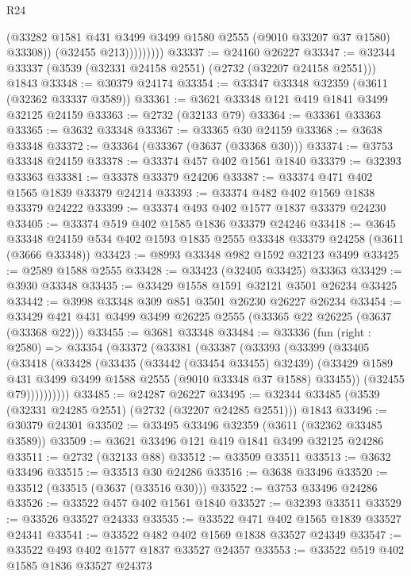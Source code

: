 \begin{lexlean}{R24}
\begin{coremodule}
                      (@33282 @1581 @431 @3499 @3499 @1580 @2555 (@9010 @33207 @37 @1580) @33308))
                    (@32455 @213)))))))))
@33337 := @24160 @26227
@33347 := @32344 @33337 (@3539 (@32331 @24158 @2551) (@2732 (@32207 @24158 @2551))) @1843
@33348 := @30379 @24174
@33354 := @33347 @33348 @32359 (@3611 (@32362 @33337 @3589))
@33361 := @3621 @33348 @121 @419 @1841 @3499 @32125 @24159
@33363 := @2732 (@32133 @79)
@33364 := @33361 @33363
@33365 := @3632 @33348
@33367 := @33365 @30 @24159
@33368 := @3638 @33348
@33372 := @33364 (@33367 (@3637 (@33368 @30)))
@33374 := @3753 @33348 @24159
@33378 := @33374 @457 @402 @1561 @1840
@33379 := @32393 @33363
@33381 := @33378 @33379 @24206
@33387 := @33374 @471 @402 @1565 @1839 @33379 @24214
@33393 := @33374 @482 @402 @1569 @1838 @33379 @24222
@33399 := @33374 @493 @402 @1577 @1837 @33379 @24230
@33405 := @33374 @519 @402 @1585 @1836 @33379 @24246
@33418 := @3645
    @33348
    @24159
    @534
    @402
    @1593
    @1835
    @2555
    @33348
    @33379
    @24258
    (@3611 (@3666 @33348))
@33423 := @8993 @33348 @982 @1592 @32123 @3499
@33425 := @2589 @1588 @2555
@33428 := @33423 (@32405 @33425) @33363
@33429 := @3930 @33348
@33435 := @33429 @1558 @1591 @32121 @3501 @26234 @33425
@33442 := @3998 @33348 @309 @851 @3501 @26230 @26227 @26234
@33454 := @33429 @421 @431 @3499 @3499 @26225 @2555 (@33365 @22 @26225 (@3637 (@33368 @22)))
@33455 := @3681 @33348
@33484 := @33336
    (fun (right : @2580) =>
    @33354
      (@33372
        (@33381
          (@33387
            (@33393
              (@33399
                (@33405
                  (@33418
                    (@33428
                      (@33435
                        (@33442 (@33454 @33455) @32439)
                        (@33429 @1589 @431 @3499 @3499 @1588 @2555 (@9010 @33348 @37 @1588) @33455))
                      (@32455 @79))))))))))
@33485 := @24287 @26227
@33495 := @32344 @33485 (@3539 (@32331 @24285 @2551) (@2732 (@32207 @24285 @2551))) @1843
@33496 := @30379 @24301
@33502 := @33495 @33496 @32359 (@3611 (@32362 @33485 @3589))
@33509 := @3621 @33496 @121 @419 @1841 @3499 @32125 @24286
@33511 := @2732 (@32133 @88)
@33512 := @33509 @33511
@33513 := @3632 @33496
@33515 := @33513 @30 @24286
@33516 := @3638 @33496
@33520 := @33512 (@33515 (@3637 (@33516 @30)))
@33522 := @3753 @33496 @24286
@33526 := @33522 @457 @402 @1561 @1840
@33527 := @32393 @33511
@33529 := @33526 @33527 @24333
@33535 := @33522 @471 @402 @1565 @1839 @33527 @24341
@33541 := @33522 @482 @402 @1569 @1838 @33527 @24349
@33547 := @33522 @493 @402 @1577 @1837 @33527 @24357
@33553 := @33522 @519 @402 @1585 @1836 @33527 @24373

\end{coremodule}
\end{lexlean}
